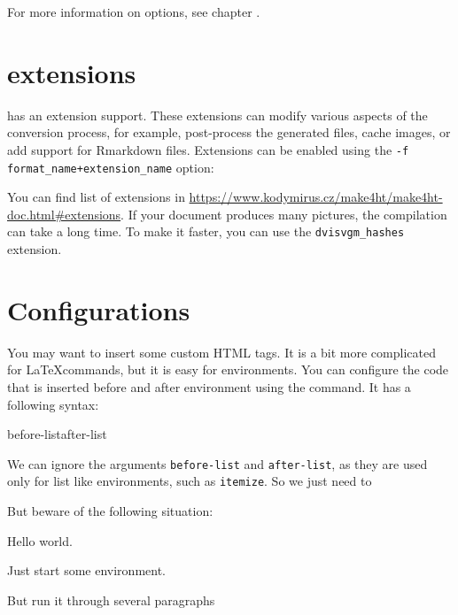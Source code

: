 For more information on options, see chapter .

\section{\makefourht{} extensions}

\makefourht{} has an extension support. These extensions can modify various aspects of the conversion process, for example, post-process the generated files, cache images, or add support for Rmarkdown files.
Extensions can be enabled using the \texttt{-f format_name+extension_name} option:


You can find list of extensions in \href{\makefourht{} documentation}{https://www.kodymirus.cz/make4ht/make4ht-doc.html#extensions}.
If your document produces many pictures, the compilation can take a long time. To make it faster, you can use the \verb|dvisvgm_hashes| extension.

\section{Configurations}
\label{sec:tutorial-configurations}

You may want to insert some custom HTML tags. It is a bit more complicated for
\LaTeX commands, but it is easy for environments. You can configure the code that is 
inserted before and after environment using the \texcommand{\ConfigureEnv} command.
It has a following syntax:

\begin{texsource}
{before-list}{after-list}
\end{texsource}

We can ignore the arguments \texttt{before-list} and \texttt{after-list}, as they
are used only for list like environments, such as \texttt{itemize}. So we just need to






But beware of the following situation:

\begin{texsource}
Hello world.
\begin{someenv}
Just start some environment.

But run it through several paragraphs
\end{someenv}
\end{texsource}

